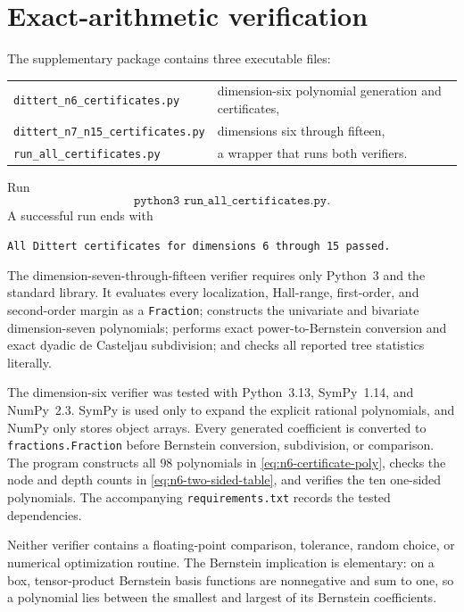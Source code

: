 \documentclass[11pt]{article}
\theoremstyle{definition}
\newcommand{\1}{\mathbf{1}}
\begin{document}
\section{Exact-arithmetic verification}\label{app:code}

The supplementary package contains three executable files:
\begin{center}
\begin{tabular}{ll}
\texttt{dittert\_n6\_certificates.py}
 & dimension-six polynomial generation and certificates,\\
\texttt{dittert\_n7\_n15\_certificates.py}
 & dimensions six through fifteen,\\
\texttt{run\_all\_certificates.py}
 & a wrapper that runs both verifiers.
\end{tabular}
\end{center}
Run
\[
 \texttt{python3 run\_all\_certificates.py}.
\]
A successful run ends with
\begin{center}
\texttt{All Dittert certificates for dimensions 6 through 15 passed.}
\end{center}

The dimension-seven-through-fifteen verifier requires only Python~3 and the
standard library.  It evaluates every localization, Hall-range,
first-order, and second-order margin as a \texttt{Fraction}; constructs the
univariate and bivariate dimension-seven polynomials; performs exact
power-to-Bernstein conversion and exact dyadic de Casteljau subdivision; and
checks all reported tree statistics literally.

The dimension-six verifier was tested with Python~3.13, SymPy~1.14, and
NumPy~2.3.  SymPy is used only to expand the explicit rational polynomials,
and NumPy only stores object arrays.  Every generated coefficient is
converted to \texttt{fractions.Fraction} before Bernstein conversion,
subdivision, or comparison.  The program constructs all $98$ polynomials in
\eqref{eq:n6-certificate-poly}, checks the node and depth counts in
\eqref{eq:n6-two-sided-table}, and verifies the ten one-sided polynomials.
The accompanying \texttt{requirements.txt} records the tested dependencies.

Neither verifier contains a floating-point comparison, tolerance, random
choice, or numerical optimization routine.  The Bernstein implication is
elementary: on a box, tensor-product Bernstein basis functions are
nonnegative and sum to one, so a polynomial lies between the smallest and
largest of its Bernstein coefficients.
\end{document}
